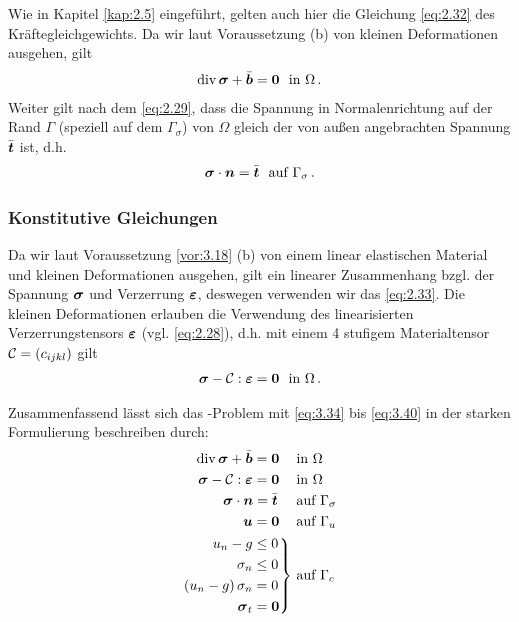 Wie in Kapitel \ref{kap:2.5} eingeführt, gelten auch hier die Gleichung \eqref{eq:2.32} des Kräftegleichgewichts. Da wir laut Voraussetzung (b) von kleinen Deformationen ausgehen, gilt
\begin{align}\label{eq:3.38}
	\operatorname{div}\boldsymbol \sigma + \bar{\boldsymbol b} = \boldsymbol 0 \ \text{ in } \Omega\, .
\end{align}
Weiter gilt nach dem  \eqref{eq:2.29}, dass die Spannung in Normalenrichtung auf der Rand $\Gamma$ (speziell auf dem  $\Gamma_\sigma$) von $\Omega$ gleich der von außen angebrachten Spannung $\bar{\boldsymbol t}$ ist, d.h.
\begin{align}\label{eq:3.39}
	\boldsymbol \sigma \cdot \boldsymbol n = \bar{\boldsymbol t} \ \text{ auf } \Gamma_\sigma \, .
\end{align}



\subsubsection{Konstitutive Gleichungen}



Da wir laut Voraussetzung \ref{vor:3.18} (b) von einem linear elastischen Material und kleinen Deformationen ausgehen, gilt ein linearer Zusammenhang bzgl. der Spannung $\boldsymbol \sigma$ und Verzerrung $\boldsymbol {\varepsilon}$, deswegen verwenden wir das  \eqref{eq:2.33}. Die kleinen Deformationen erlauben die Verwendung des linearisierten Verzerrungstensors $\boldsymbol {\varepsilon}$ (vgl. \eqref{eq:2.28}), d.h. mit einem 4 stufigem Materialtensor $\mathcal C = (c_{ijkl})$ gilt
\begin{align}\label{eq:3.40}
	\boldsymbol \sigma - \mathcal C : \boldsymbol {\varepsilon} = \boldsymbol 0 \ \text{ in } \Omega \, .
\end{align}


Zusammenfassend lässt sich das -Problem mit \eqref{eq:3.34} bis \eqref{eq:3.40} in der starken Formulierung beschreiben durch:
\begin{subequations}\label{eq:3.41}
\begin{align}\label{eq:3.41a}
	\operatorname{div} \boldsymbol \sigma + \bar{\boldsymbol b} = \boldsymbol 0\ \ \: & \text{ in } \Omega\\
	\label{eq:3.41b}
	\boldsymbol \sigma  - \mathcal C :\boldsymbol {\varepsilon}  = \boldsymbol 0\ \ \: & \text{ in } \Omega\\
	\label{eq:3.41c}
	\boldsymbol \sigma \cdot \boldsymbol n = \bar{\boldsymbol t} \ \ \ & \text{ auf } \Gamma_\sigma \\
	\label{eq:3.41d}
	\boldsymbol u = \boldsymbol 0 \ \  \: & \text{ auf }\Gamma_u \\
	\label{eq:3.41e}
	\left.
	\begin{aligned}
		 u_n  - g& \le 0 \\
		\sigma_n &\le 0 \\
		(u_n  - g)\,  \sigma_n &= 0  \\
		\boldsymbol \sigma_t &= \boldsymbol 0
	\end{aligned} \right\} &
\text{ auf } \Gamma_c  
\end{align}
\end{subequations}


